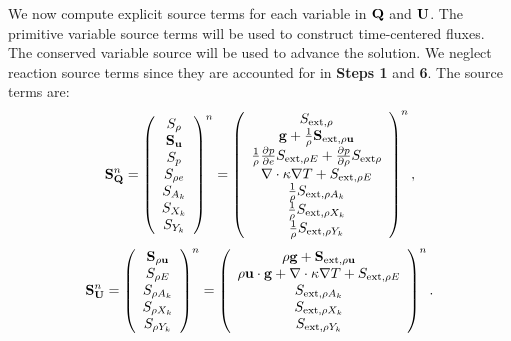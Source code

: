 \begin{description}
We now compute explicit source terms for each variable in ${\bf Q}$ and
${\bf U}$.  The primitive variable source terms will be used to construct
time-centered fluxes.  The conserved variable source will be used to
advance the solution.  We neglect reaction source terms since they are
accounted for in {\bf Steps 1} and {\bf 6}.  The source terms are:
\begin{equation}
{\bf S}_{{\bf Q}}^n =
\left(\begin{array}{c}
S_\rho \\
{\bf S}_{{\bf u}} \\
S_p \\
S_{\rho e} \\
S_{A_k} \\
S_{X_k} \\
S_{Y_k}
\end{array}\right)^n
=
\left(\begin{array}{c}
S_{{\rm ext},\rho} \\
{\bf g} + \frac{1}{\rho}{\bf S}_{{\rm ext},\rho{\bf u}} \\
\frac{1}{\rho}\frac{\partial p}{\partial e}S_{{\rm ext},\rho E} + \frac{\partial p}{\partial\rho}S_{{\rm ext}\rho} \\
\nabla\cdot\kappa\nabla T + S_{{\rm ext},\rho E} \\
\frac{1}{\rho}S_{{\rm ext},\rho A_k} \\
\frac{1}{\rho}S_{{\rm ext},\rho X_k} \\
\frac{1}{\rho}S_{{\rm ext},\rho Y_k}
\end{array}\right)^n,
\end{equation}
\begin{equation}
{\bf S}_{{\bf U}}^n =
\left(\begin{array}{c}
{\bf S}_{\rho{\bf u}} \\
S_{\rho E} \\
S_{\rho A_k} \\
S_{\rho X_k} \\
S_{\rho Y_k}
\end{array}\right)^n
=
\left(\begin{array}{c}
\rho {\bf g} + {\bf S}_{{\rm ext},\rho{\bf u}} \\
\rho {\bf u} \cdot {\bf g} + \nabla\cdot\kappa\nabla T + S_{{\rm ext},\rho E} \\
S_{{\rm ext},\rho A_k} \\
S_{{\rm ext},\rho X_k} \\
S_{{\rm ext},\rho Y_k}
\end{array}\right)^n.
\end{equation}


\end{description}
